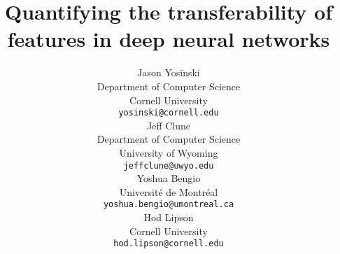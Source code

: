 \documentclass{article} %
\title{Quantifying the transferability of features in deep neural networks}
\author{
Jason Yosinski \\
Department of Computer Science\\
Cornell University \\
\texttt{yosinski@cornell.edu} \\
\And
Jeff Clune \\
Department of Computer Science \\
University of Wyoming \\
\texttt{jeffclune@uwyo.edu} \\
\AND
Yoshua Bengio \\
Universit\'{e} de Montr\'{e}al \\
\texttt{yoshua.bengio@umontreal.ca} \\
\And
Hod Lipson \\
Cornell University \\
\texttt{hod.lipson@cornell.edu} \\
}
\begin{document}
\maketitle

\begin{abstract}

\end{abstract}





%



{\small
%


}
\end{document}
